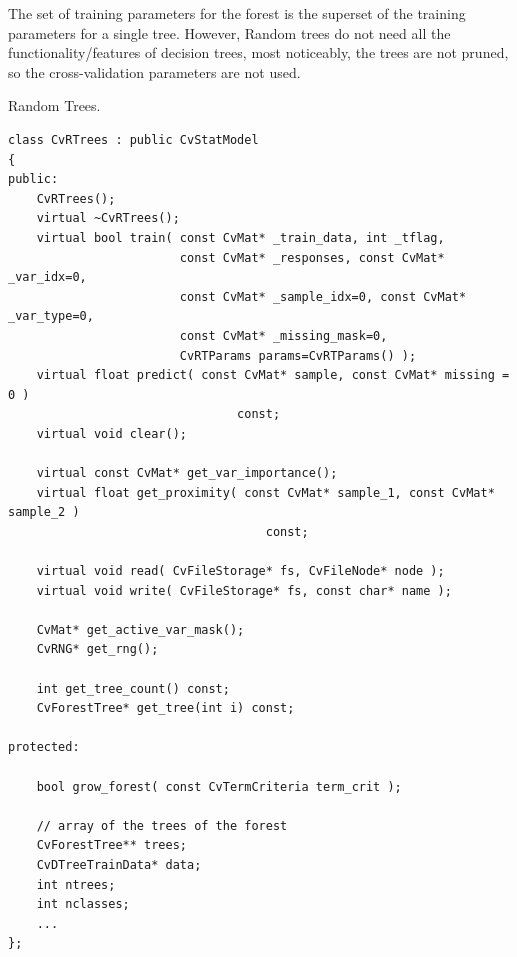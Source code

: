 %

The set of training parameters for the forest is the superset of the training parameters for a single tree. However, Random trees do not need all the functionality/features of decision trees, most noticeably, the trees are not pruned, so the cross-validation parameters are not used.


Random Trees.

\begin{lstlisting}
class CvRTrees : public CvStatModel
{
public:
    CvRTrees();
    virtual ~CvRTrees();
    virtual bool train( const CvMat* _train_data, int _tflag,
                        const CvMat* _responses, const CvMat* _var_idx=0,
                        const CvMat* _sample_idx=0, const CvMat* _var_type=0,
                        const CvMat* _missing_mask=0,
                        CvRTParams params=CvRTParams() );
    virtual float predict( const CvMat* sample, const CvMat* missing = 0 ) 
								const;
    virtual void clear();

    virtual const CvMat* get_var_importance();
    virtual float get_proximity( const CvMat* sample_1, const CvMat* sample_2 ) 
									const;

    virtual void read( CvFileStorage* fs, CvFileNode* node );
    virtual void write( CvFileStorage* fs, const char* name );

    CvMat* get_active_var_mask();
    CvRNG* get_rng();

    int get_tree_count() const;
    CvForestTree* get_tree(int i) const;

protected:

    bool grow_forest( const CvTermCriteria term_crit );

    // array of the trees of the forest
    CvForestTree** trees;
    CvDTreeTrainData* data;
    int ntrees;
    int nclasses;
    ...
};
\end{lstlisting}


